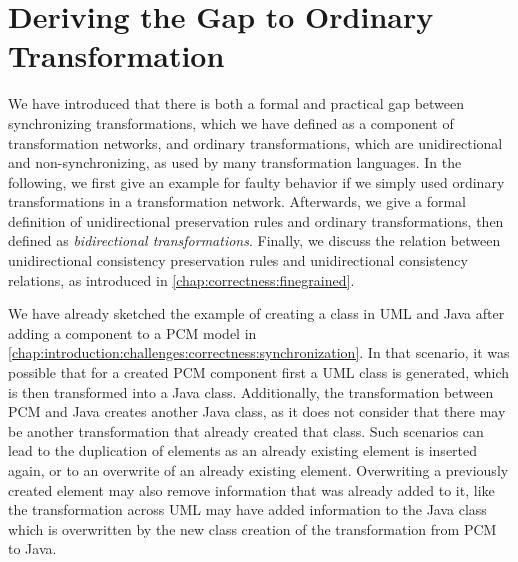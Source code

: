 \section{Deriving the Gap to Ordinary Transformation}

We have introduced that there is both a formal and practical gap between synchronizing transformations, which we have defined as a component of transformation networks, and ordinary transformations, which are unidirectional and non-synchronizing, as used by many transformation languages.
In the following, we first give an example for faulty behavior if we simply used ordinary transformations in a transformation network.
Afterwards, we give a formal definition of unidirectional preservation rules and ordinary transformations, then defined as \emph{bidirectional transformations}.
Finally, we discuss the relation between unidirectional consistency preservation rules and unidirectional consistency relations, as introduced in \autoref{chap:correctness:finegrained}.



We have already sketched the example of creating a class in \gls{UML} and Java after adding a component to a \gls{PCM} model in \autoref{chap:introduction:challenges:correctness:synchronization}.
In that scenario, it was possible that for a created \gls{PCM} component first a \gls{UML} class is generated, which is then transformed into a Java class.
Additionally, the transformation between \gls{PCM} and Java creates another Java class, as it does not consider that there may be another transformation that already created that class.
Such scenarios can lead to the duplication of elements as an already existing element is inserted again, or to an overwrite of an already existing element.
Overwriting a previously created element may also remove information that was already added to it, like the transformation across \gls{UML} may have added information to the Java class which is overwritten by the new class creation of the transformation from \gls{PCM} to Java.

